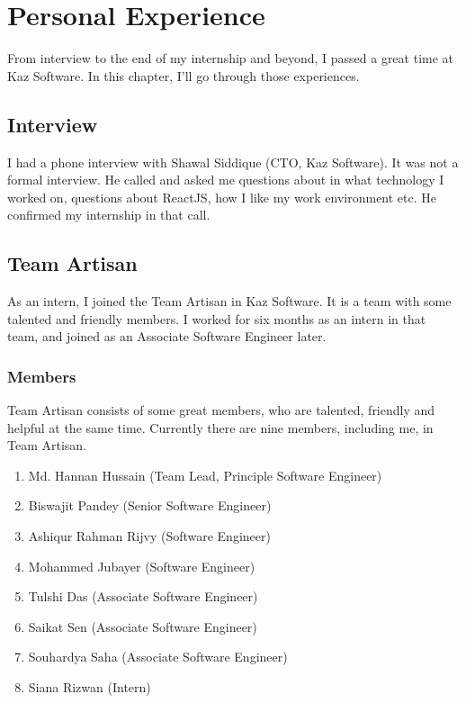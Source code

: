 \chapter{Personal Experience}

From interview to the end of my internship and beyond, I passed a great time at Kaz Software.
In this chapter, I'll go through those experiences.

\section{Interview}

I had a phone interview with Shawal Siddique (CTO, Kaz Software).
It was not a formal interview.
He called and asked me questions about in what technology I worked on, questions about ReactJS, how I like my work environment etc.
He confirmed my internship in that call.

\section{Team Artisan}

As an intern, I joined the Team Artisan in Kaz Software.
It is a team with some talented and friendly members.
I worked for six months as an intern in that team, and joined as an Associate Software Engineer later.

\subsection{Members}

Team Artisan consists of some great members, who are talented, friendly and helpful at the same time.
Currently there are nine members, including me, in Team Artisan.

\begin{enumerate}
    \item Md. Hannan Hussain (Team Lead, Principle Software Engineer)
    \item Biswajit Pandey (Senior Software Engineer)
    \item Ashiqur Rahman Rijvy (Software Engineer)
    \item Mohammed Jubayer (Software Engineer)
    \item Tulshi Das (Associate Software Engineer)
    \item Saikat Sen (Associate Software Engineer)
    \item Souhardya Saha (Associate Software Engineer)
    \item Siana Rizwan (Intern) 
\end{enumerate}

